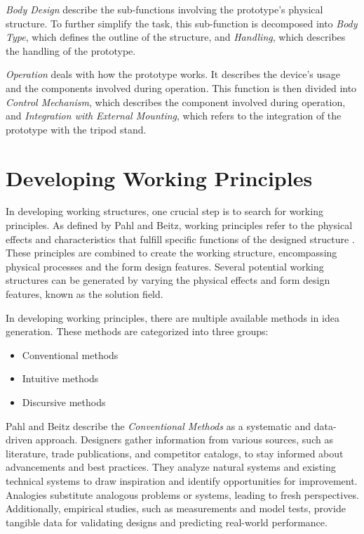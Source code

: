 \textit{Body Design} describe the sub-functions involving the prototype's physical structure. To further simplify the task, this sub-function is decomposed into \textit{Body Type}, which defines the outline of the structure, and \textit{Handling}, which describes the handling of the prototype.

\textit{Operation} deals with how the prototype works. It describes the device's usage and the components involved during operation. This function is then divided into \textit{Control Mechanism}, which describes the component involved during operation, and \textit{Integration with External Mounting}, which refers to the integration of the prototype with the tripod stand.

\section{Developing Working Principles}

In developing working structures, one crucial step is to search for working principles. As defined by Pahl and Beitz, working principles refer to the physical effects and characteristics that fulfill specific functions of the designed structure \cite{Pahl07f}. These principles are combined to create the working structure, encompassing physical processes and the form design features. Several potential working structures can be generated by varying the physical effects and form design features, known as the solution field.

In developing working principles, there are multiple available methods in idea generation. These methods are categorized into three groups:

\begin{itemize}
    \item Conventional methods
    \item Intuitive methods
    \item Discursive methods
\end{itemize}

Pahl and Beitz \cite{Pahl07g} describe the \textit{Conventional Methods} as a systematic and data-driven approach. Designers gather information from various sources, such as literature, trade publications, and competitor catalogs, to stay informed about advancements and best practices. They analyze natural systems and existing technical systems to draw inspiration and identify opportunities for improvement. Analogies substitute analogous problems or systems, leading to fresh perspectives. Additionally, empirical studies, such as measurements and model tests, provide tangible data for validating designs and predicting real-world performance.


